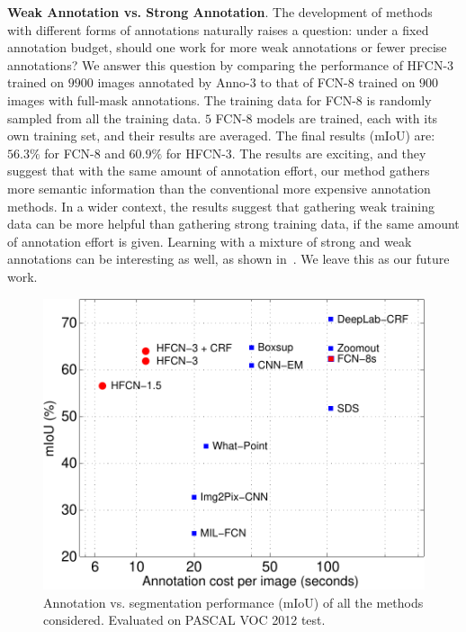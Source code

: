 \textbf{Weak Annotation vs. Strong Annotation}.  The development of
methods with different forms of annotations naturally raises a
question: under a fixed annotation budget, should one work for more
weak annotations or fewer precise annotations?  We answer this
question by comparing the performance of HFCN-3 trained on $9900$
images annotated by Anno-3 to that of FCN-8 trained on $900$ images
with full-mask annotations. The training data for FCN-8 is randomly
sampled from all the training data. $5$ FCN-8 models are trained, each
with its own training set, and their results are averaged. The final
results (mIoU) are: $56.3\%$ for FCN-8 and $60.9\%$ for HFCN-3. The
results are exciting, and they suggest that with the same amount of
annotation effort, our method gathers more semantic information than
the conventional more expensive annotation methods. In a wider
context, the results suggest that gathering weak training data can be
more helpful than gathering strong training data, if the same amount
of annotation effort is given.  Learning with a mixture of strong and
weak annotations can be interesting as well, as shown
in~\citep{BoxSup}. We leave this as our future work.


\begin{figure}%
  \centering
  \includegraphics[width=0.65\linewidth]{./draw_and_tell/fig6/anno_cost_mIoU.pdf}  \vspace{-3mm} 
  \caption{Annotation vs. segmentation performance (mIoU) of all the
    methods considered. Evaluated on PASCAL VOC 2012 test.}
\label{./draw_and_tell/fig:6}  
\end{figure}


